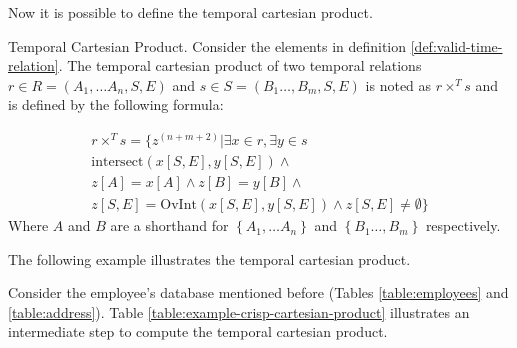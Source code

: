 Now it is possible to define the temporal cartesian product.

\begin{definition}
 \label{def:crisp-temporal-cartesian-product}
Temporal Cartesian Product. Consider the elements in definition \ref{def:valid-time-relation}.
The temporal cartesian product of two temporal relations $r \in R = \left(A_1, \ldots A_n, S, E \right)$ and $s \in S = \left(B_1 \ldots, B_m, S, E \right)$ is noted as $r \times^T s$ and is defined by the following formula:

\begin{align}
 \label{eq:crisp-temporal-cartesian-product}
r \times^T s =  \lbrace z^{\left(n+m+2 \right)} | \exists x \in r, \exists y \in s \\
\nonumber
\mbox{intersect}\left(x[S,E], y[S,E] \right) \wedge \\
\nonumber
z\left[A\right] = x\left[A\right] \wedge z\left[B\right] = y \left[B \right] \wedge \\
\nonumber
 z\left[S, E \right] = \mbox{OvInt}\left(x\left[S, E\right], y\left[S, E\right] \right) \wedge z\left[S, E\right] \neq \emptyset  \rbrace
\end{align}
Where $A$ and $B$ are a shorthand for $\left \lbrace A_1, \ldots A_n\right \rbrace$ and $\left \lbrace B_1 \ldots, B_m\right \rbrace$ respectively.
\end{definition}

The following example illustrates the temporal cartesian product.
\begin{example}
 \label{ex:crisp-temporal-cartesian-product}
Consider the employee's database mentioned before (Tables \ref{table:employees} and \ref{table:address}). Table \ref{table:example-crisp-cartesian-product} illustrates an intermediate step to compute the temporal cartesian  product.



\end{example}

